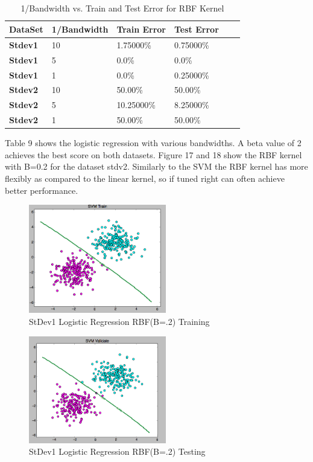 \documentclass[pageno]{jpaper}
\begin{document}
\subsection{}
\begin{table}[h!]
  \centering
  \begin{tabular}{llllll|}
    \hline
     \textbf{DataSet}  & \textbf{1/Bandwidth} &\textbf{Train Error} & \textbf{Test Error}\\
    \hline
    \hline
 \textbf{Stdev1} 	   &10 &1.75000\% & 0.75000\%\\
 \hline
  \textbf{Stdev1} 	   &5 &0.0\% & 0.0\%\\
 \hline
  \textbf{Stdev1} 	   &1 &0.0\% & 0.25000\%\\
 \hline
 \textbf{Stdev2} 	   &10 &50.00\% & 50.00\%\\
 \hline
  \textbf{Stdev2} 	   &5 &10.25000\% & 8.25000\%\\
 \hline
  \textbf{Stdev2} 	   &1 &50.00\% & 50.00\%\\
 \hline
  \end{tabular}
  \caption{1/Bandwidth vs. Train and Test Error for RBF Kernel}
  \label{table:formatting}
\end{table}
Table 9 shows the logistic regression with various bandwidths. A beta value of 2 achieves the best score on both datasets. Figure 17 and 18 show the RBF kernel with B=0.2 for the dataset stdv2. Similarly to the SVM the RBF kernel has more flexibly as compared to the linear kernel, so if tuned right can often achieve better performance. 
\begin{figure}[ht!]
\centering
\includegraphics[width=60mm]{stdev1_rbf_lr_train_5}
\caption{StDev1 Logistic Regression RBF(B=.2)  Training}
\label{overflow}
\end{figure}
\begin{figure}[ht!]
\centering
\includegraphics[width=60mm]{stdev1_rbf_lr_test_5}
\caption{StDev1 Logistic Regression RBF(B=.2) Testing}
\label{overflow}
\end{figure}
\end{document}
